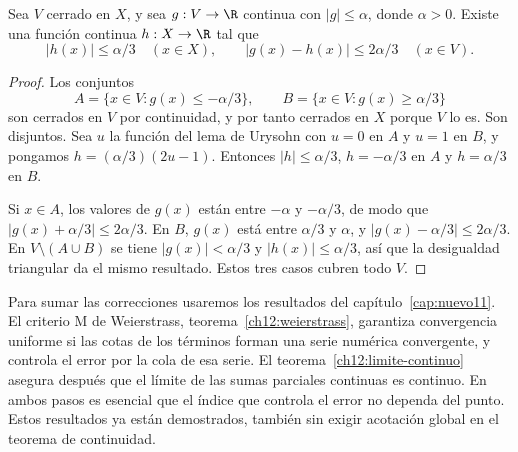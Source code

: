 \begin{lema}\label{ch12:correccion}
Sea $V$ cerrado en $X$, y sea $g:V\to\R$ continua con $|g|\leq\alpha$, donde $\alpha>0$. Existe una función continua $h:X\to\R$ tal que
\[
 |h(x)|\leq\alpha/3\quad(x\in X),\qquad
 |g(x)-h(x)|\leq2\alpha/3\quad(x\in V).
\]
\end{lema}
\begin{proof}
Los conjuntos
\[
 A=\{x\in V:g(x)\leq-\alpha/3\},\qquad
 B=\{x\in V:g(x)\geq\alpha/3\}
\]
son cerrados en $V$ por continuidad, y por tanto cerrados en $X$ porque $V$ lo es. Son disjuntos. Sea $u$ la función del lema de Urysohn con $u=0$ en $A$ y $u=1$ en $B$, y pongamos $h=(\alpha/3)(2u-1)$. Entonces $|h|\leq\alpha/3$, $h=-\alpha/3$ en $A$ y $h=\alpha/3$ en $B$.

Si $x\in A$, los valores de $g(x)$ están entre $-\alpha$ y $-\alpha/3$, de modo que $|g(x)+\alpha/3|\leq2\alpha/3$. En $B$, $g(x)$ está entre $\alpha/3$ y $\alpha$, y $|g(x)-\alpha/3|\leq2\alpha/3$. En $V\setminus(A\cup B)$ se tiene $|g(x)|<\alpha/3$ y $|h(x)|\leq\alpha/3$, así que la desigualdad triangular da el mismo resultado. Estos tres casos cubren todo $V$.
\end{proof}

Para sumar las correcciones usaremos los resultados del capítulo~\ref{cap:nuevo11}. El criterio M de Weierstrass, teorema~\ref{ch12:weierstrass}, garantiza convergencia uniforme si las cotas de los términos forman una serie numérica convergente, y controla el error por la cola de esa serie. El teorema~\ref{ch12:limite-continuo} asegura después que el límite de las sumas parciales continuas es continuo. En ambos pasos es esencial que el índice que controla el error no dependa del punto. Estos resultados ya están demostrados, también sin exigir acotación global en el teorema de continuidad.

